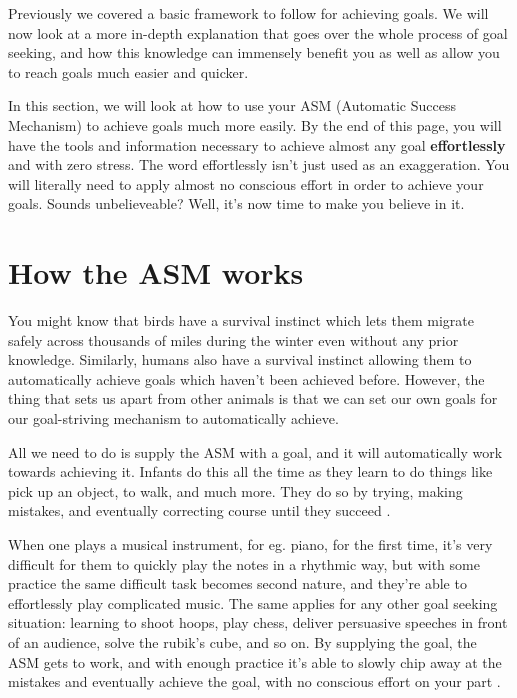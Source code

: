 \documentclass[
]{book}
\begin{document}
Previously we covered a basic framework to follow for achieving goals. We will now look at a more in-depth explanation that goes over the whole process of goal seeking, and how this knowledge can immensely benefit you as well as allow you to reach goals much easier and quicker.

In this section, we will look at how to use your ASM (Automatic Success Mechanism) to achieve goals much more easily. By the end of this page, you will have the tools and information necessary to achieve almost any goal \textbf{effortlessly} and with zero stress. The word effortlessly isn't just used as an exaggeration. You will literally need to apply almost no conscious effort in order to achieve your goals. Sounds unbelieveable? Well, it's now time to make you believe in it.

\hypertarget{how-the-asm-works}{%
\section{How the ASM works}\label{how-the-asm-works}}

You might know that birds have a survival instinct which lets them migrate safely across thousands of miles during the winter even without any prior knowledge. Similarly, humans also have a survival instinct allowing them to automatically achieve goals which haven't been achieved before. However, the thing that sets us apart from other animals is that we can set our own goals for our goal-striving mechanism to automatically achieve.

All we need to do is supply the ASM with a goal, and it will automatically work towards achieving it. Infants do this all the time as they learn to do things like pick up an object, to walk, and much more. They do so by trying, making mistakes, and eventually correcting course until they succeed \citep{asm}.

When one plays a musical instrument, for eg. piano, for the first time, it's very difficult for them to quickly play the notes in a rhythmic way, but with some practice the same difficult task becomes second nature, and they're able to effortlessly play complicated music. The same applies for any other goal seeking situation: learning to shoot hoops, play chess, deliver persuasive speeches in front of an audience, solve the rubik's cube, and so on. By supplying the goal, the ASM gets to work, and with enough practice it's able to slowly chip away at the mistakes and eventually achieve the goal, with no conscious effort on your part \citep{subconscious}.
\end{document}
